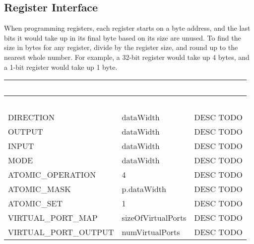 \subsection{Register Interface}
 
When programming registers, each register starts on a byte address, and the last bits it would take up in its final byte based on its size are unused. To find the size in bytes for any register, divide by the register size, and round up to the nearest whole number. For example, a 32-bit register would take up 4 bytes, and a 1-bit register would take up 1 byte.
\renewcommand*{\arraystretch}{1.4}
\begingroup
\small
{} %
\begin{longtable}[H]{
  | p{}
  | p{}
  | p{} |
  }
  \hline
  \rowcolor{dark-gray}

  \textcolor{white}{\textbf{Name}} &   
  \textcolor{white}{\textbf{Size (Bits)}} &   
  \textcolor{white}{\textbf{Description}} \\ \hline \hline
  \endfirsthead

  \textcolor{white}{\textbf{Name}} &   
  \textcolor{white}{\textbf{Size (Bits)}} &   
  \textcolor{white}{\textbf{Description}} \\ \hline \hline
  \endhead

  
  DIRECTION  &   
  dataWidth &   
  DESC TODO \\ \hline

  OUTPUT &   
  dataWidth &   
  DESC TODO \\ \hline

  INPUT &   
  dataWidth &   
  DESC TODO \\ \hline

  MODE &   
  dataWidth &   
  DESC TODO \\ \hline

  ATOMIC\_OPERATION &   
  4 &   
  DESC TODO \\ \hline

  ATOMIC\_MASK &   
  p.dataWidth &   
  DESC TODO \\ \hline

  ATOMIC\_SET &   
  1 &   
  DESC TODO \\ \hline

  VIRTUAL\_PORT\_MAP &   
  sizeOfVirtualPorts &   
  DESC TODO \\ \hline

  VIRTUAL\_PORT\_OUTPUT &   
  numVirtualPorts &   
  DESC TODO \\ \hline


\end{longtable}
